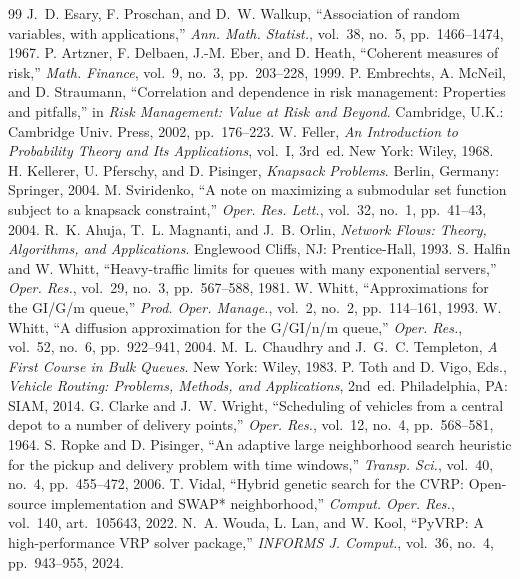 \documentclass[10pt,twocolumn,letterpaper]{article}
\theoremstyle{definition}
\begin{document}
\begin{thebibliography}{99}
 J.~D. Esary, F. Proschan, and D.~W. Walkup, ``Association of random variables, with applications,'' \emph{Ann. Math. Statist.}, vol.~38, no.~5, pp.~1466--1474, 1967.
 P. Artzner, F. Delbaen, J.-M. Eber, and D. Heath, ``Coherent measures of risk,'' \emph{Math. Finance}, vol.~9, no.~3, pp.~203--228, 1999.
 P. Embrechts, A. McNeil, and D. Straumann, ``Correlation and dependence in risk management: Properties and pitfalls,'' in \emph{Risk Management: Value at Risk and Beyond}. Cambridge, U.K.: Cambridge Univ. Press, 2002, pp.~176--223.
 W. Feller, \emph{An Introduction to Probability Theory and Its Applications}, vol.~I, 3rd~ed. New York: Wiley, 1968.
 H. Kellerer, U. Pferschy, and D. Pisinger, \emph{Knapsack Problems}. Berlin, Germany: Springer, 2004.
 M. Sviridenko, ``A note on maximizing a submodular set function subject to a knapsack constraint,'' \emph{Oper. Res. Lett.}, vol.~32, no.~1, pp.~41--43, 2004.
 R.~K. Ahuja, T.~L. Magnanti, and J.~B. Orlin, \emph{Network Flows: Theory, Algorithms, and Applications}. Englewood Cliffs, NJ: Prentice-Hall, 1993.
 S. Halfin and W. Whitt, ``Heavy-traffic limits for queues with many exponential servers,'' \emph{Oper. Res.}, vol.~29, no.~3, pp.~567--588, 1981.
 W. Whitt, ``Approximations for the GI/G/m queue,'' \emph{Prod. Oper. Manage.}, vol.~2, no.~2, pp.~114--161, 1993.
 W. Whitt, ``A diffusion approximation for the G/GI/n/m queue,'' \emph{Oper. Res.}, vol.~52, no.~6, pp.~922--941, 2004.
 M.~L. Chaudhry and J.~G.~C. Templeton, \emph{A First Course in Bulk Queues}. New York: Wiley, 1983.
 P. Toth and D. Vigo, Eds., \emph{Vehicle Routing: Problems, Methods, and Applications}, 2nd~ed. Philadelphia, PA: SIAM, 2014.
 G. Clarke and J.~W. Wright, ``Scheduling of vehicles from a central depot to a number of delivery points,'' \emph{Oper. Res.}, vol.~12, no.~4, pp.~568--581, 1964.
 S. Ropke and D. Pisinger, ``An adaptive large neighborhood search heuristic for the pickup and delivery problem with time windows,'' \emph{Transp. Sci.}, vol.~40, no.~4, pp.~455--472, 2006.
 T. Vidal, ``Hybrid genetic search for the CVRP: Open-source implementation and SWAP* neighborhood,'' \emph{Comput. Oper. Res.}, vol.~140, art.~105643, 2022.
 N.~A. Wouda, L. Lan, and W. Kool, ``PyVRP: A high-performance VRP solver package,'' \emph{INFORMS J. Comput.}, vol.~36, no.~4, pp.~943--955, 2024.

\end{thebibliography}
\end{document}
